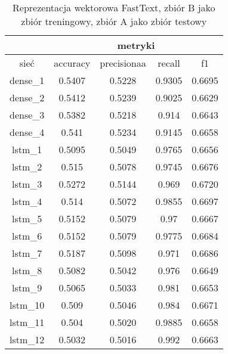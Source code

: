 \begin{table}[] \centering
    \caption{Reprezentacja wektorowa FastText, zbiór B jako zbiór treningowy, zbiór A jako zbiór testowy }
    \label{tab:wyniki_300_eks2}
    \begin{tabular}{|c|c|c|c|c|}
        \hline
                 & \multicolumn{4}{c|}{metryki}                                 \\ \hline
        sieć     & accuracy                     & precisionaa & recall & f1     \\ \hline
        dense\_1 & 0.5407                       & 0.5228      & 0.9305 & 0.6695 \\ \hline
        dense\_2 & 0.5412                       & 0.5239      & 0.9025 & 0.6629 \\ \hline
        dense\_3 & 0.5382                       & 0.5218      & 0.914  & 0.6643 \\ \hline
        dense\_4 & 0.541                        & 0.5234      & 0.9145 & 0.6658 \\ \hline
        lstm\_1  & 0.5095                       & 0.5049      & 0.9765 & 0.6656 \\ \hline
        lstm\_2  & 0.515                        & 0.5078      & 0.9745 & 0.6676 \\ \hline
        lstm\_3  & 0.5272                       & 0.5144      & 0.969  & 0.6720 \\ \hline
        lstm\_4  & 0.514                        & 0.5072      & 0.9855 & 0.6697 \\ \hline
        lstm\_5  & 0.5152                       & 0.5079      & 0.97   & 0.6667 \\ \hline
        lstm\_6  & 0.5152                       & 0.5079      & 0.9775 & 0.6684 \\ \hline
        lstm\_7  & 0.5187                       & 0.5098      & 0.971  & 0.6686 \\ \hline
        lstm\_8  & 0.5082                       & 0.5042      & 0.976  & 0.6649 \\ \hline
        lstm\_9  & 0.5065                       & 0.5033      & 0.981  & 0.6653 \\ \hline
        lstm\_10 & 0.509                        & 0.5046      & 0.984  & 0.6671 \\ \hline
        lstm\_11 & 0.504                        & 0.5020      & 0.9885 & 0.6658 \\ \hline
        lstm\_12 & 0.5032                       & 0.5016      & 0.992  & 0.6663 \\ \hline

\end{tabular}
\end{table}
